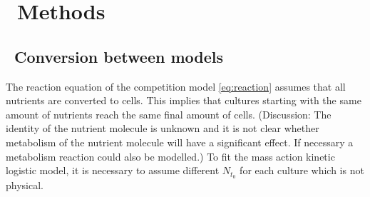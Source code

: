 \graphicspath{{images/}}

\section{\thesection~Methods}
\label{sec:methods}

\subsection{\thesubsection~Conversion between models}

The reaction equation of the competition model \ref{eq:reaction}
assumes that all nutrients are converted to cells. This implies that
cultures starting with the same amount of nutrients reach the same
final amount of cells. (Discussion: The identity of the nutrient
molecule is unknown and it is not clear whether metabolism of the
nutrient molecule will have a significant effect. If necessary a
metabolism reaction could also be modelled.) To fit the mass action
kinetic logistic model, it is necessary to assume different
\(N_{t_{0}}\) for each culture which is not physical.



